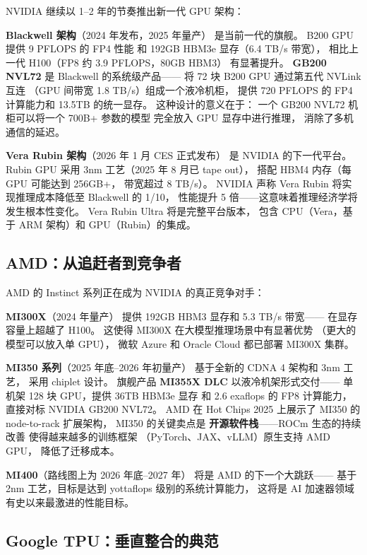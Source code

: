 NVIDIA 继续以 1--2 年的节奏推出新一代 GPU 架构：

\textbf{Blackwell 架构}（2024 年发布，2025 年量产）
是当前一代的旗舰。
B200 GPU 提供 9 PFLOPS 的 FP4 性能
和 192GB HBM3e 显存（6.4 TB/s 带宽），
相比上一代 H100（FP8 约 3.9 PFLOPS，80GB HBM3）
有显著提升。
\textbf{GB200 NVL72} 是 Blackwell 的系统级产品——
将 72 块 B200 GPU 通过第五代 NVLink 互连
（GPU 间带宽 1.8 TB/s）组成一个液冷机柜，
提供 720 PFLOPS 的 FP4 计算能力和 13.5TB 的统一显存。
这种设计的意义在于：
一个 GB200 NVL72 机柜可以将一个 700B+ 参数的模型
完全放入 GPU 显存中进行推理，
消除了多机通信的延迟。

\textbf{Vera Rubin 架构}（2026 年 1 月 CES 正式发布）
是 NVIDIA 的下一代平台。
Rubin GPU 采用 3nm 工艺（2025 年 8 月已 tape out），
搭配 HBM4 内存（每 GPU 可能达到 256GB+，
带宽超过 8 TB/s）。
NVIDIA 声称 Vera Rubin 将实现推理成本降低至 Blackwell 的 1/10，
性能提升 5 倍——这意味着推理经济学将发生根本性变化。
Vera Rubin Ultra 将是完整平台版本，
包含 CPU（Vera，基于 ARM 架构）和 GPU（Rubin）的集成。

\subsection{AMD：从追赶者到竞争者}

AMD 的 Instinct 系列正在成为 NVIDIA 的真正竞争对手：

\textbf{MI300X}（2024 年量产）
提供 192GB HBM3 显存和 5.3 TB/s 带宽——
在显存容量上超越了 H100。
这使得 MI300X 在大模型推理场景中有显著优势
（更大的模型可以放入单 GPU），
微软 Azure 和 Oracle Cloud 都已部署 MI300X 集群。

\textbf{MI350 系列}（2025 年底--2026 年初量产）
基于全新的 CDNA 4 架构和 3nm 工艺，
采用 chiplet 设计。
旗舰产品 \textbf{MI355X DLC} 以液冷机架形式交付——
单机架 128 块 GPU，提供 36TB HBM3e 显存
和 2.6 exaflops 的 FP8 计算能力，
直接对标 NVIDIA GB200 NVL72。
AMD 在 Hot Chips 2025 上展示了 MI350 的 node-to-rack 扩展架构，
MI350 的关键卖点是
\textbf{开源软件栈}——ROCm 生态的持续改善
使得越来越多的训练框架
（PyTorch、JAX、vLLM）原生支持 AMD GPU，
降低了迁移成本。

\textbf{MI400}（路线图上为 2026 年底--2027 年）
将是 AMD 的下一个大跳跃——
基于 2nm 工艺，目标是达到 yottaflops 级别的系统计算能力，
这将是 AI 加速器领域有史以来最激进的性能目标。

\subsection{Google TPU：垂直整合的典范}

